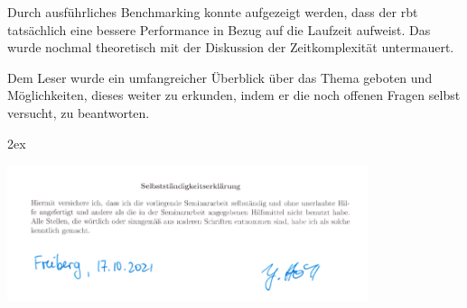 \documentclass[11pt]{article}
\begin{document}
Durch ausführliches Benchmarking konnte aufgezeigt werden, dass der \gls{rbt} tatsächlich eine bessere Performance in Bezug auf die Laufzeit aufweist.
Das wurde nochmal theoretisch mit der Diskussion der Zeitkomplexität untermauert. 

Dem Leser wurde ein umfangreicher Überblick über das Thema geboten und Möglichkeiten, dieses weiter zu erkunden, 
indem er die noch offenen Fragen selbst versucht, zu beantworten. 

\pagebreak
\begingroup
\parindent 0pt
\parskip 2ex
\def\enotesize{\normalsize}
\theendnotes
\endgroup

\pagebreak
\vspace*{\fill}
\begin{center}
  \includegraphics[width=400px]{selbst.png}  
\end{center}
\vspace*{\fill}

\pagebreak

\end{document}
